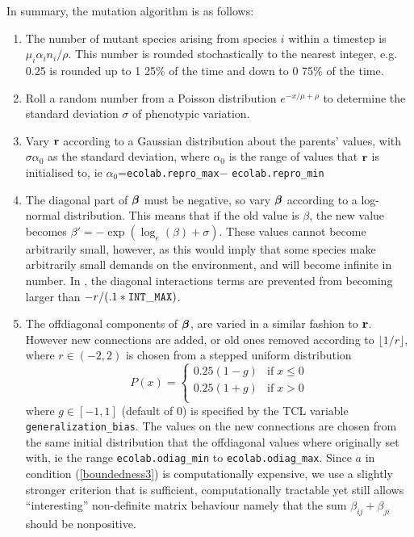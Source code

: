 In summary, the mutation algorithm is as follows:
\begin{enumerate}
\item The number of mutant species arising from species $i$ within a
timestep is $\mu_i\alpha_in_i/\rho$. This number is rounded
stochastically to the nearest integer, e.g. 0.25 is rounded up to 1
25\% of the time and down to 0 75\% of the time.

\item Roll a random number from a Poisson distribution
$e^{-x/\mu+\rho}$ to determine the standard deviation $\sigma$ of phenotypic
variation. 

\item Vary $\mbox{${\bf r}$}$ according to a Gaussian distribution about the
  parents' values, with $\sigma\alpha_0$ as the standard deviation,
  where $\alpha_0$ is the range of values that $\mbox{${\bf r}$}$ is initialised to,
  ie $\alpha_0$=\verb|ecolab.repro_max|$-$
  \verb|ecolab.repro_min|

\item The diagonal part of $\mbox{\boldmath{$\beta$}}$ must be negative, so vary $\mbox{\boldmath{$\beta$}}$
according to a log-normal distribution. This means that if the old
value is $\beta$, the new value becomes
$\beta'=-\exp(\log_e(\beta)+\sigma)$. These values cannot become
arbitrarily small, however, as this would imply that some species make
arbitrarily small demands on the environment, and will become infinite
in number. In \EcoLab{}, the diagonal interactions terms are prevented from
becoming larger than $-r/(.1*{\tt INT\_MAX})$.

\item The offdiagonal components of $\mbox{\boldmath{$\beta$}}$, are varied in a similar
fashion to $\mbox{${\bf r}$}$. However new connections are added, or old ones
removed according to $\lfloor 1/r\rfloor$, where $r\in(-2,2)$ is
chosen from a stepped uniform distribution 
\begin{displaymath}
P(x)=\left\{
\begin{array}{ll}
0.25(1-g) & \mathrm{if}\; x\leq0\\
0.25(1+g) & \mathrm{if}\; x>0\\
\end{array}
\right.
\end{displaymath}
where $g\in[-1,1]$ (default of 0) is specified by the TCL variable
\verb+generalization_bias+. The values on
the new connections are chosen from the same initial distribution that
the offdiagonal values where originally set with, ie the range
\verb|ecolab.odiag_min| to
\verb|ecolab.odiag_max|. Since $a$ in
condition (\ref{boundedness3}) is computationally expensive, we use a
slightly stronger criterion that is sufficient, computationally
tractable yet still allows ``interesting'' non-definite matrix
behaviour namely that the sum $\beta_{ij}+\beta_{ji}$ should be
nonpositive.



\end{enumerate}
